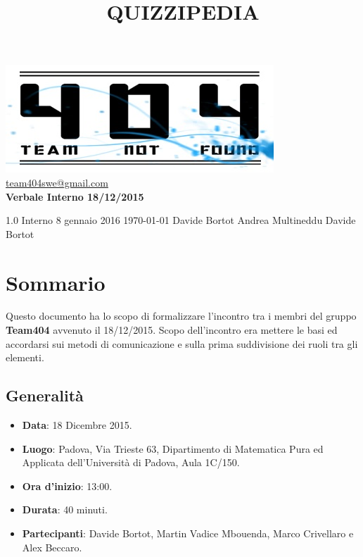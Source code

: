 \documentclass[a4paper,11pt]{article}
\title{\textbf{{\fontsize{10mm}{6mm}\selectfont QUIZZIPEDIA}}}
\begin{document}
	\maketitle
	
	\begin{center}

	\includegraphics{../../team_not_found.jpg}\\	
	\fontsize{5mm}{3mm}\url{team404swe@gmail.com}\\
	\vspace{40mm}
	\textbf{ Verbale Interno 18/12/2015 }
	\end{center}
	\thispagestyle{empty}	%
			{1.0} 							%
			{Interno} 						%
			{8 gennaio 2016} 				%
			{\today} 						%
			{Davide Bortot}					%
			{Andrea Multineddu} 			%
			{Davide Bortot} 				%
	
	\newpage
	\section{Sommario}
	Questo documento ha lo scopo di formalizzare l'incontro tra i membri del gruppo \textbf{Team404} avvenuto il 18/12/2015. Scopo dell'incontro era mettere le basi ed accordarsi sui metodi di comunicazione e sulla prima suddivisione dei ruoli tra gli elementi.
	\subsection{Generalità}
	\begin{itemize}
	\item\textbf{Data}: 18 Dicembre 2015.
	\item\textbf{Luogo}: Padova, Via Trieste 63, Dipartimento di Matematica Pura ed Applicata dell'Università di Padova, Aula 1C/150.
	\item\textbf{Ora d'inizio}: 13:00.
	\item\textbf{Durata}: 40 minuti.
	\item\textbf{Partecipanti}: Davide Bortot, Martin Vadice Mbouenda, Marco Crivellaro e Alex Beccaro.
	\end{itemize}
\end{document}
